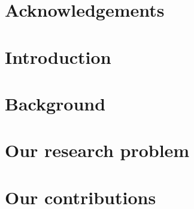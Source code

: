 \documentclass[showtrims, oldfontcommands]{kthesis}
\begin{document}

\pagestyle{headings}

%
\clearpage
{}
{}
\chapter*{Acknowledgements}

\cleardoublepage

%
\clearforchapter
\tableofcontents
\cleardoublepage

\mainmatter

%
\cleardoublepage
\chapter{Introduction}
    \label{chapter:thesis:introduction}

\clearpage

%
\cleardoublepage
\chapter{Background}
    \label{chapter:thesis:background}

\clearpage

%
\cleardoublepage
\chapter{Our research problem}
    \label{chapter:thesis:our-research-problem}

\clearpage

%
\cleardoublepage
\chapter{Our contributions}
    \label{chapter:thesis:our-contributions}
\renewcommand\thesection{\Alph{section}}

\clearpage

%
\cleardoublepage
\renewcommand\thesection{\thechapter.\arabic{section}}

\clearpage

%
\cleardoublepage
\end{document}
